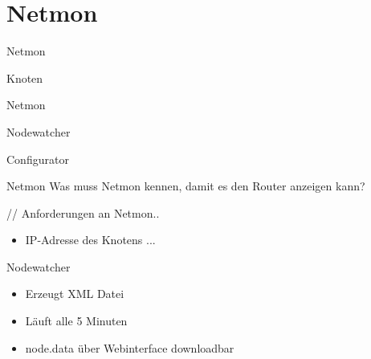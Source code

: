 \section{Netmon}


\begin{frame}{Netmon}

    Knoten
    
    Netmon

    Nodewatcher

    Configurator

\end{frame}

\begin{frame}{Netmon}
    Was muss Netmon kennen, damit es den Router anzeigen kann?

    // Anforderungen an Netmon..

    \begin{itemize}
        \item IP-Adresse des Knotens
            ...
    \end{itemize}
\end{frame}


\begin{frame}{Nodewatcher}
    \begin{itemize}
        \item Erzeugt XML Datei
        \item Läuft alle 5 Minuten
        \item node.data über Webinterface downloadbar
    \end{itemize}
\end{frame}

